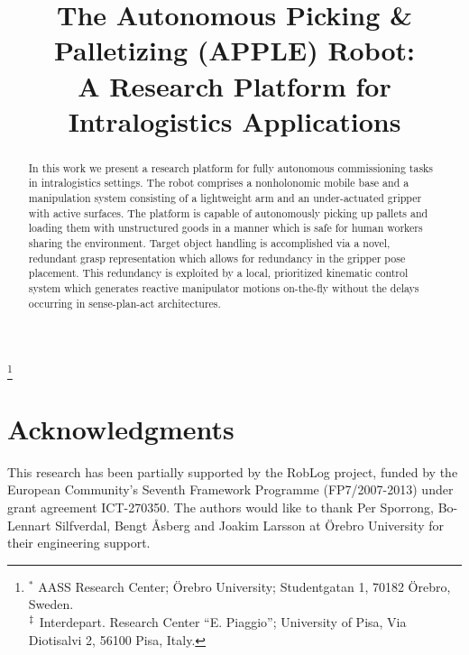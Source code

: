 \documentclass[usletter, 10pt, conference]{ieeeconf}
\title{The Autonomous Picking \& Palletizing (APPLE) Robot:\\ A Research Platform for
  Intralogistics Applications}
\author{ \authorblockN{Robert Krug\superscript{*}, Todor Stoyanov\superscript{*}, Vinicio
    Tincani\superscript{\ddag}, Henrik Andreasson\superscript{*},\\ Rafael Mosberger\superscript{*},
    Gualtiero Fantoni\superscript{\ddag}, Antonio Bicchi\superscript{\ddag} and Achim J. Lilienthal\superscript{*}}
}
\newcommand{\superscript}[1]{\ensuremath{^{\textrm{#1}}}}
\newcommand\blfootnote[1]{%
  \begingroup
  \renewcommand\thefootnote{}\footnote{#1}%
  \addtocounter{footnote}{-1}%
  \endgroup
}
\begin{document}
\maketitle
\thispagestyle{empty}
\pagestyle{empty}
%
\blfootnote{\hspace{-4.5mm} \superscript{*} AASS Research Center; {\"O}rebro University; Studentgatan 1, 70182 {\"O}rebro, Sweden.\\
  \superscript{\ddag} Interdepart. Research Center ``E. Piaggio''; University of Pisa, Via Diotisalvi 2, 56100 Pisa, Italy.}
%
\begin{abstract}
  In this work we present a research platform for fully autonomous commissioning tasks in
  intralogistics settings. The robot comprises a nonholonomic mobile base and a manipulation system
  consisting of a lightweight arm and an under-actuated gripper with active surfaces. The platform
  is capable of autonomously picking up pallets and loading them with unstructured goods in a manner
  which is safe for human workers sharing the environment. Target object handling is accomplished
  via a novel, redundant grasp representation which allows for redundancy in the gripper pose
  placement. This redundancy is exploited by a local, prioritized kinematic control system which
  generates reactive manipulator motions on-the-fly without the delays occurring in sense-plan-act
  architectures.
\end{abstract}
%
 
%

%

%

%


%
\section*{Acknowledgments}
%
This research has been partially supported by the RobLog project, funded by the European Community’s
Seventh Framework Programme (FP7/2007-2013) under grant agreement ICT-270350. The authors would like
to thank Per Sporrong, Bo-Lennart Silfverdal, Bengt {\AA}sberg and Joakim Larsson at {\"O}rebro
University for their engineering support.
%



\end{document}
